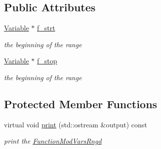 \subsection*{Public Attributes}
\begin{DoxyCompactItemize}
\item 
\mbox{\label{class_s_m_spp__di__unipi__it_1_1_function_mod_vars_rngd_abfb3d0ce20f6d45595c1b576b59e10c5}} 
\mbox{\hyperlink{class_s_m_spp__di__unipi__it_1_1_variable}{Variable}} $\ast$ \mbox{\hyperlink{class_s_m_spp__di__unipi__it_1_1_function_mod_vars_rngd_abfb3d0ce20f6d45595c1b576b59e10c5}{f\+\_\+strt}}
\begin{DoxyCompactList}\small\item\em the beginning of the range \end{DoxyCompactList}\item 
\mbox{\label{class_s_m_spp__di__unipi__it_1_1_function_mod_vars_rngd_a81e34474b3a449d64d4bc006effb1347}} 
\mbox{\hyperlink{class_s_m_spp__di__unipi__it_1_1_variable}{Variable}} $\ast$ \mbox{\hyperlink{class_s_m_spp__di__unipi__it_1_1_function_mod_vars_rngd_a81e34474b3a449d64d4bc006effb1347}{f\+\_\+stop}}
\begin{DoxyCompactList}\small\item\em the beginning of the range \end{DoxyCompactList}\end{DoxyCompactItemize}
\subsection*{Protected Member Functions}
\begin{DoxyCompactItemize}
\item 
\mbox{\label{class_s_m_spp__di__unipi__it_1_1_function_mod_vars_rngd_a2e7b9c9148a98c5c342e8c25cac95926}} 
virtual void \mbox{\hyperlink{class_s_m_spp__di__unipi__it_1_1_function_mod_vars_rngd_a2e7b9c9148a98c5c342e8c25cac95926}{print}} (std\+::ostream \&output) const
\begin{DoxyCompactList}\small\item\em print the \mbox{\hyperlink{class_s_m_spp__di__unipi__it_1_1_function_mod_vars_rngd}{Function\+Mod\+Vars\+Rngd}} \end{DoxyCompactList}\end{DoxyCompactItemize}
